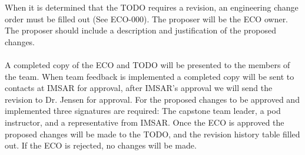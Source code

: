 
When it is determined that the TODO requires a revision, an engineering change order must be filled out (See ECO-000). The proposer will be the ECO owner. The proposer should include a description and justification of the proposed changes.
~\\~\\
A completed copy of the ECO and TODO will be presented to the members of the team. When team feedback is implemented a completed copy will be sent to contacts at IMSAR for approval, after  IMSAR's approval we will send the revision to Dr. Jensen for approval. For the proposed changes to be approved and implemented three signatures are required: The capstone team leader, a pod instructor, and a representative from IMSAR. Once the ECO is approved the proposed changes will be made to the TODO, and the revision history table filled out. If the ECO is rejected, no changes will be made. 
